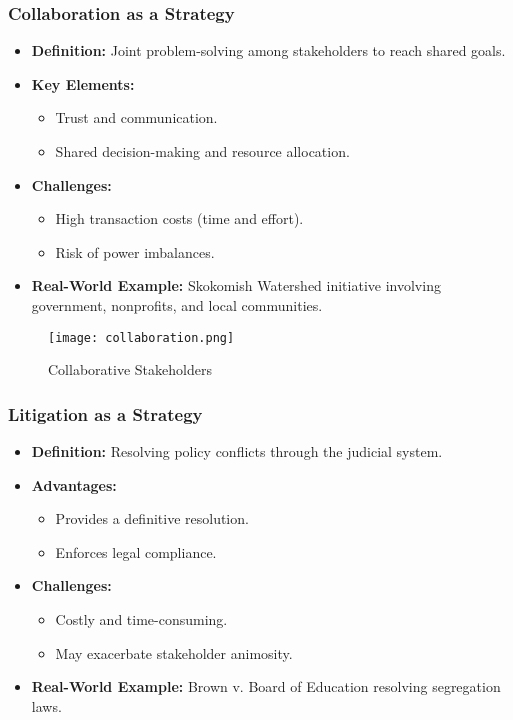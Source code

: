 \documentclass[10pt]{beamer}
\begin{document}
        \begin{frame}
        \frametitle{Collaboration as a Strategy}
        \begin{itemize}
            \item \textbf{Definition:} Joint problem-solving among stakeholders to reach shared goals.
            \item \textbf{Key Elements:}
                \begin{itemize}
                    \item Trust and communication.
                    \item Shared decision-making and resource allocation.
                \end{itemize}
            \item \textbf{Challenges:}
                \begin{itemize}
                    \item High transaction costs (time and effort).
                    \item Risk of power imbalances.
                \end{itemize}
            \item \textbf{Real-World Example:} Skokomish Watershed initiative involving government, nonprofits, and local communities.
        \end{itemize}
        
        \begin{figure}
            \centering
            \texttt{[image: collaboration.png]}
            \caption{Collaborative Stakeholders}
        \end{figure}
        \end{frame}
        
        \begin{frame}
        \frametitle{Litigation as a Strategy}
        \begin{itemize}
            \item \textbf{Definition:} Resolving policy conflicts through the judicial system.
            \item \textbf{Advantages:}
                \begin{itemize}
                    \item Provides a definitive resolution.
                    \item Enforces legal compliance.
                \end{itemize}
            \item \textbf{Challenges:}
                \begin{itemize}
                    \item Costly and time-consuming.
                    \item May exacerbate stakeholder animosity.
                \end{itemize}
            \item \textbf{Real-World Example:} Brown v. Board of Education resolving segregation laws.
        \end{itemize}
        \end{frame}
\end{document}
